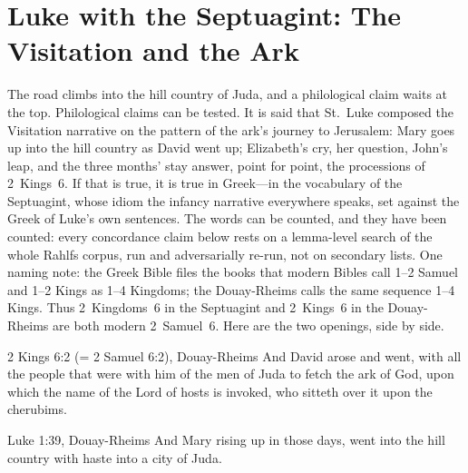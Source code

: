 \sectionguard
\section{Luke with the Septuagint: The Visitation and the Ark}

The road climbs into the hill country of Juda, and a philological claim
waits at the top. Philological claims can be tested.
It is said that St.~Luke composed the Visitation narrative on the pattern
of the ark's journey to Jerusalem: Mary goes up into the hill country as
David went up; Elizabeth's cry, her question, John's leap, and the three
months' stay answer, point for point, the processions of 2~Kings~6. If that is true, it is true in Greek---in the vocabulary
of the Septuagint, whose idiom the infancy narrative everywhere speaks,
set against the Greek of Luke's own sentences. The words can be counted,
and they have been counted: every concordance claim below rests on a
lemma-level search of the whole Rahlfs corpus, run and adversarially
re-run, not on secondary lists. One naming
note: the Greek Bible files the books that modern Bibles call 1--2 Samuel and
1--2 Kings as 1--4 Kingdoms; the Douay-Rheims calls the same sequence 1--4
Kings.  Thus 2~Kingdoms~6 in the Septuagint and 2~Kings~6 in the Douay-Rheims
are both modern 2~Samuel~6.
Here are the two openings, side by side.

\begin{witnessbox}{2 Kings 6:2 (= 2 Samuel 6:2), Douay-Rheims}
And David arose and went, with all the people that were with him of the men
of Juda to fetch the ark of God, upon which the name of the Lord of hosts
is invoked, who sitteth over it upon the cherubims.
\end{witnessbox}

\begin{witnessbox}{Luke 1:39, Douay-Rheims}
And Mary rising up in those days, went into the hill country with haste
into a city of Juda.
\end{witnessbox}

